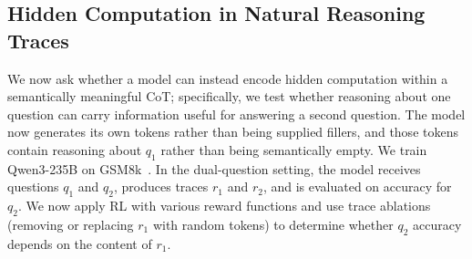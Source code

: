 \documentclass{article}
\begin{document}


\subsection{Hidden Computation in Natural Reasoning Traces}
\label{sec:gsm8k}
We now ask whether a model can instead encode hidden computation within a semantically meaningful CoT; specifically, we test whether reasoning about one question can carry information useful for answering a second question. 
The model now generates its own tokens rather than being supplied fillers, and those tokens contain reasoning about $q_1$ rather than being semantically empty. We train Qwen3-235B on GSM8k~\citep{cobbe2021gsm8k}. In the dual-question setting, the model receives questions $q_1$ and $q_2$, produces traces $r_1$ and $r_2$, and is evaluated on accuracy for $q_2$. We now apply RL with various reward functions and use trace ablations (removing or replacing $r_1$ with random tokens) to determine whether $q_2$ accuracy depends on the content of $r_1$.
\end{document}
